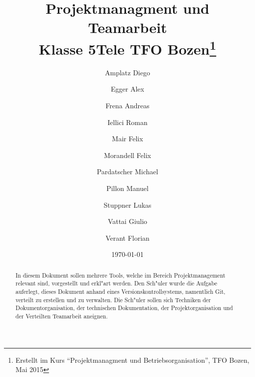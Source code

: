 \documentclass[a4paper]{article}
\title{Projektmanagment und Teamarbeit\\Klasse 5Tele TFO Bozen\thanks{Erstellt 
im Kurs ``Projektmanagment und Betriebsorganisation'', TFO Bozen, Mai 2015}}
\author{Amplatz Diego
\and	Egger Alex
\and	Frena Andreas
\and	Iellici Roman
\and	Mair Felix
\and	Morandell Felix
\and	Pardatscher Michael
\and	Pillon Manuel
\and	Stuppner Lukas
\and	Vattai Giulio
\and	Verant Florian}
\begin{document}
\date{\today}

\maketitle

\begin{abstract}
 In diesem Dokument sollen mehrere Tools, welche im Bereich Projektmanagement relevant sind, vorgestellt und erkl"art werden. Den Sch"uler wurde die Aufgabe auferlegt, dieses Dokument anhand eines Versionskontrollsystems, namentlich Git, verteilt zu erstellen und zu verwalten. Die Sch"uler sollen sich Techniken der Dokumentorganisation, der technischen Dokumentation, der Projektorganisation und der Verteilten Teamarbeit aneignen.
\end{abstract}

\newpage


\begin{sloppypar}
\tableofcontents













\end{sloppypar}
\end{document}
